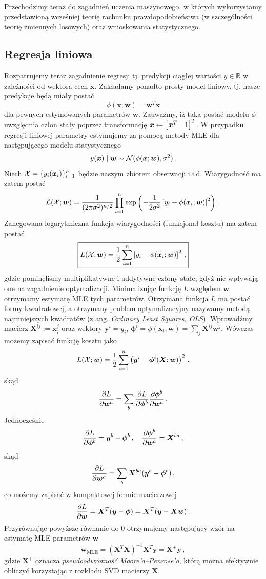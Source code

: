 \documentclass{myclass}
\numberwithin{equation}{subsection}
\begin{document}
Przechodzimy teraz do zagadnień uczenia maszynowego, w których wykorzystamy przedstawioną wcześniej
teorię rachunku prawdopodobieństwa (w szczególności teorię zmiennych losowych) oraz wnioskowania
statystycznego.


\subsection{Regresja liniowa}

Rozpatrujemy teraz zagadnienie regresji tj. predykcji ciągłej wartości \(y \in \mathbb{R}\) w
zależności od wektora cech \(\bm{x}\). Zakładamy ponadto prosty model liniowy, tj. nasze predykcje
będą miały postać
\[
\phi(\bm{x}; \bm{w}) = \bm{w}^T \bm{x}
\]
dla pewnych estymowanych parametrów \(\bm{w}\). Zauważmy, iż taka postać modelu \(\phi\) uwzględnia
człon stały poprzez transformację \(\bm{x} \leftarrow \mqty[\bm{x}^T & 1]^T\). W przypadku regresji
liniowej parametry estymujemy za pomocą metody MLE dla następującego modelu statystycznego
\[
y(\bm{x}) \mid \bm{w} \sim \mathcal{N}(\phi(\bm{x}; \bm{w}), \sigma^2)\,.
\]
Niech \(\mathcal{X} = \{y_i(\bm{x}_i)\}_{i=1}^n\) będzie naszym zbiorem obserwacji i.i.d. Wiarygodność ma
zatem postać
\[
\mathcal{L}(\mathcal{X} ; \bm{w}) = \frac{1}{(2\pi\sigma^2)^{n/2}} \prod_{i=1}^n \exp\left(-\frac{1}{2\sigma^2}\left[y_i - \phi(\bm{x}_i; \bm{w})\right]^2\right)\,.
\]
Zanegowana logarytmiczna funkcja wiarygodności (funkcjonał kosztu) ma zatem postać
\[
\boxed{
L(\mathcal{X}; \bm{w}) = \frac{1}{2}\sum_{i=1}^n \left[y_i - \phi(\bm{x}_i; \bm{w})\right]^2\,, 
}
\]
gdzie pominęliśmy multiplikatywne i addytywne człony stałe, gdyż nie wpływają one na zagadnienie
optymalizacji. Minimalizując funkcję \(L\) względem \(\bm{w}\) otrzymamy estymatę MLE tych
parametrów. Otrzymana funkcja \(L\) ma postać formy kwadratowej, a otrzymany problem optymalizacyjny
nazywamy metodą najmniejszych kwadratów (z ang. \textit{Ordinary Least Squares, OLS}). Wprowadźmy
macierz \(\bm{X}^{ij} := \bm{x}_i^j\) oraz wektory \(\bm{y}^i = y_i\), \(\bm{\phi}^i =
\phi(\bm{x}_i; \bm{w}) = \sum_j \bm{X}^{ij} \bm{w}^j\). Wówczas możemy zapisać funkcję kosztu jako
\[
L(\mathcal{X}; \bm{w}) = \frac{1}{2}\sum_{i=1}^n \left(\bm{y}^i - \bm{\phi}^i(\bm{X}; \bm{w})\right)^2\,,
\]
skąd
\[
\pdv{L}{\bm{w}^a} = \sum_b \pdv{L}{\bm{\phi}^b} \pdv{\bm{\phi}^b}{\bm{w}^a}\,.
\]
Jednocześnie
\[
\pdv{L}{\bm{\phi}^b} = \bm{y}^b - \bm{\phi}^b\,,\quad \pdv{\bm{\phi}^b}{\bm{w}^a} = \bm{X}^{ba}\,,
\]
skąd
\[
\pdv{L}{\bm{w}^a} = \sum_b \bm{X}^{ba}(\bm{y}^b - \bm{\phi}^b)\,,
\]
co możemy zapisać w kompaktowej formie macierzowej
\[
\pdv{L}{\bm{w}} = \bm{X}^T(\bm{y} - \bm{\phi}) = \bm{X}^T(\bm{y} - \bm{X}\bm{w})\,.
\]
Przyrównując powyższe równanie do 0 otrzymujemy następujący wzór na estymatę MLE parametrów
\(\bm{w}\)
\[
\boxed{
\bm{w}_\text{MLE} = \left(\bm{X}^T\bm{X}\right)^{-1}\bm{X}^T\bm{y} = \bm{X}^+\bm{y}\,,
}
\]
gdzie \(\bm{X}^+\) oznacza \emph{pseudoodwrotność Moore'a--Penrose'a}, którą można efektywnie
obliczyć korzystając z rozkładu SVD macierzy \(\bm{X}\).
\end{document}
